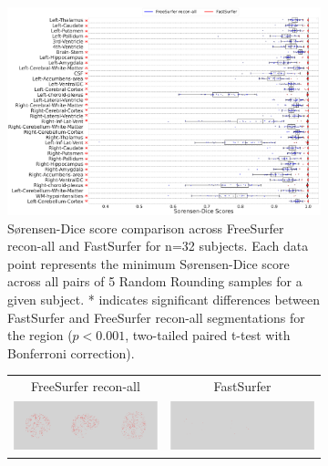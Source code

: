 \begin{figure}
  \centering
  \begin{subfigure}[b]{\linewidth}
    \hspace*{-1cm}                                                           
    \includegraphics[width=1.25\textwidth]{figures2/fastsurfer_boxplot.pdf}
    \caption{Sørensen-Dice score comparison across FreeSurfer recon-all and FastSurfer for n=32 subjects. Each data point represents the minimum Sørensen-Dice score across all pairs of 5 Random Rounding samples for a given subject. \color{red}*\color{black}\xspace indicates significant differences between FastSurfer and FreeSurfer recon-all segmentations for the region ($p < 0.001$, two-tailed paired t-test with Bonferroni correction).} 
    \label{fig:fastsurfer_boxplot}
  \end{subfigure}
  \begin{subfigure}[b]{\linewidth}
    \centering
    \vspace*{0.5cm}
  \begin{tabular}{c c}
        FreeSurfer recon-all & FastSurfer \\
        \includegraphics[width=0.5\linewidth]{figures3/special_fig/fs_sub-0027012_entropy.eps} & \includegraphics[width=0.5\linewidth]{figures3/special_fig/fast_sub-0027012_entropy.eps} \\

\end{tabular}
\end{subfigure}
\end{figure}
